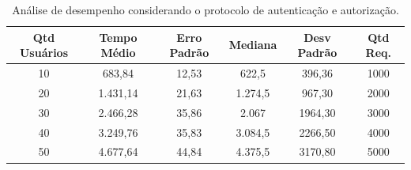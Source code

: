 \begin{table}[h]
\begin{center}
\begin{tabular}{|c|c|c|c|c|c|}
\hline
Qtd Usuários    & Tempo Médio   & Erro Padrão & Mediana  & Desv Padrão  & Qtd Req. \\ \hline
10                                    & 683,84        & 12,53       & 622,5    & 396,36       &  1000       \\ \hline
20                                    & 1.431,14      & 21,63       & 1.274,5  & 967,30       &  2000       \\ \hline
30                                    & 2.466,28      & 35,86       & 2.067    & 1964,30      &  3000       \\ \hline
40                                    & 3.249,76      & 35,83       & 3.084,5  & 2266,50      &  4000       \\ \hline
50                                    & 4.677,64      & 44,84       & 4.375,5  & 3170,80      &  5000       \\ \hline
\end{tabular}\caption {An\'{a}lise de desempenho considerando o protocolo de autenticação e autorização.}\label{tb:estatistica_com_cripto}
\end{center}
\end{table}

